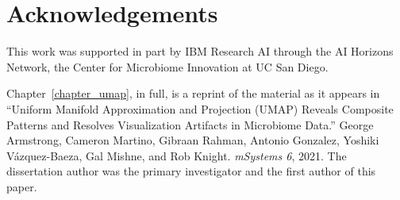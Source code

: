 	
\section{Acknowledgements}

This work was supported in part by IBM Research AI through the AI Horizons Network, the Center for Microbiome Innovation at UC San Diego.

Chapter~\ref{chapter_umap}, in full, is a reprint of the material as it appears in ``Uniform Manifold Approximation and Projection (UMAP) Reveals Composite Patterns and Resolves Visualization Artifacts in Microbiome Data.'' George Armstrong, Cameron Martino, Gibraan Rahman, Antonio Gonzalez, Yoshiki Vázquez-Baeza, Gal Mishne, and Rob Knight.  \textit{mSystems 6}, 2021. The dissertation author was the primary investigator and the first author of this paper.
